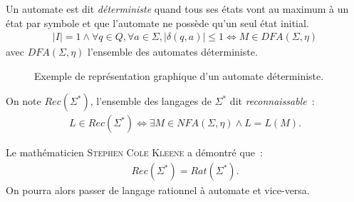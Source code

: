 \begin{definition}
  Un automate est dit \textit{déterministe} quand tous ses états vont au
  maximum à un état par symbole et que l'automate ne possède qu'un seul état
  initial.
  \begin{gather*}
    \lvert I \rvert = 1 \land \forall q \in Q, \forall a \in \Sigma, \lvert 
    \delta(q, a) \rvert \leq 1 \Longleftrightarrow M \in DFA(\Sigma, \eta)
  \end{gather*}
  avec \(DFA(\Sigma, \eta)\) l'ensemble des automates déterministe.
\end{definition}

\begin{example}
  \vspace{-\baselineskip}
  \begin{figure}[H]
    \centering
    \captionsetup{type=figure,justification=centering}
    \caption{Exemple de représentation graphique d'un automate déterministe.}
  \end{figure}
\end{example}

\begin{definition}
  On note \(Rec(\Sigma^*)\), l'ensemble des langages de \(\Sigma^*\) dit 
  \textit{reconnaissable}~:
  \begin{align*}
    L \in Rec(\Sigma^*) \Longleftrightarrow \exists M \in NFA(\Sigma, \eta)
    \land L = L(M).
  \end{align*}
\end{definition}

\begin{theorem}
  Le mathématicien \textsc{Stephen Cole Kleene} a démontré que~:
  \begin{align*}
    Rec(\Sigma^*) = Rat(\Sigma^*).
  \end{align*}
  On pourra alors passer de langage rationnel à automate et vice-versa.
\end{theorem}

